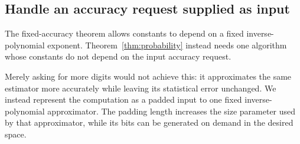 \documentclass[11pt]{article}
\numberwithin{equation}{section}
\theoremstyle{definition}
\theoremstyle{remark}
\begin{document}
\subsection{Handle an accuracy request supplied as input}

The fixed-accuracy theorem allows constants to depend on a fixed inverse-polynomial exponent. Theorem~\ref{thm:probability} instead needs one algorithm whose constants do not depend on the input accuracy request.

Merely asking for more digits would not achieve this: it approximates the same estimator more accurately while leaving its statistical error unchanged. We instead represent the computation as a padded input to one fixed inverse-polynomial approximator. The padding length increases the size parameter used by that approximator, while its bits can be generated on demand in the desired space.
\end{document}
